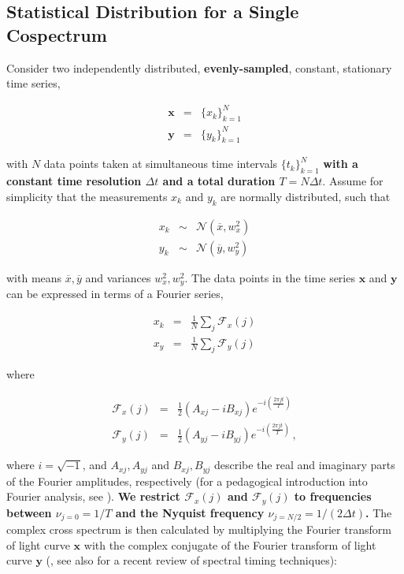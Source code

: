 \documentclass[12pt]{emulateapj}
\begin{document}
\subsection{Statistical Distribution for a Single Cospectrum}
\label{sec:single_cospectrum}

Consider two independently distributed, \textbf{evenly-sampled}, constant, stationary time series,

\begin{eqnarray}
\mathbf{x} &=& \{x_k\}_{k=1}^N \nonumber \\
\mathbf{y} &=& \{y_k\}_{k=1}^N \nonumber
\end{eqnarray}

\noindent with $N$ data points taken at simultaneous time intervals $\{t_k\}_{k=1}^N$ \textbf{with a constant time resolution $\Delta t$ and a total duration $T = N\Delta t$}. Assume for simplicity that the measurements $x_k$ and $y_k$ are normally distributed, such that 

\begin{eqnarray}
x_k &\sim& \mathcal{N}(\overline{x}, w_x^2)  \nonumber \\
y_k &\sim& \mathcal{N}(\overline{y}, w_y^2) \nonumber
\end{eqnarray} 

\noindent with means $\overline{x}, \overline{y}$ and variances $w_x^2, w_y^2$. The data points in the time series $\mathbf{x}$ and $\mathbf{y}$ can be expressed in terms of a Fourier series,

\begin{eqnarray}
x_k & = & \frac{1}{N} \sum_{j}{\mathcal{F}_x(j)} \nonumber \\
x_y & = & \frac{1}{N} \sum_{j}{\mathcal{F}_y(j)}
\end{eqnarray}

\noindent where

\begin{eqnarray}
\mathcal{F}_x(j) &= & \frac{1}{2} (A_{xj} - i B_{xj}) e^{-i\left( \frac{2 \pi j t}{T} \right)} \\
\mathcal{F}_y(j) &= & \frac{1}{2} (A_{yj} - i B_{yj}) e^{-i\left( \frac{2 \pi j t}{T} \right)} \, ,
\end{eqnarray}

\noindent where $i = \sqrt{-1}$, and $A_{xj}, A_{yj}$ and $B_{xj}, B_{yj}$ describe the real and imaginary parts of the Fourier amplitudes, respectively (for a pedagogical introduction into Fourier analysis, see \citealt{vanderklis1989}). \textbf{We restrict $\mathcal{F}_x(j)$ and $\mathcal{F}_y(j)$ to frequencies between $\nu_{j=0} = 1/T$ and the Nyquist frequency $\nu_{j=N/2} = 1/(2\Delta t)$.}
The complex cross spectrum is then calculated by multiplying the Fourier transform of light curve $\mathbf{x}$ with the complex conjugate of the Fourier transform of light curve $\mathbf{y}$ (\citealt{vaughan1997,nowak1999}, see also \citealt{uttley2014} for a recent review of spectral timing techniques):
\end{document}
